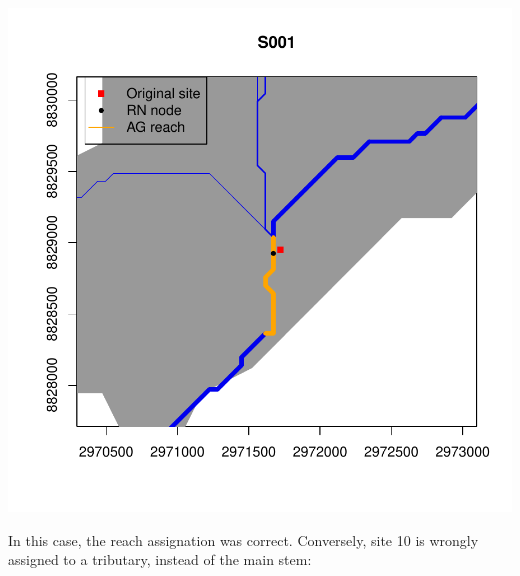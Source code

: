 \documentclass[
]{article}
\newenvironment{Shaded}{\begin{snugshade}}{\end{snugshade}}
\newcommand{\AttributeTok}[1]{\textcolor[rgb]{0.13,0.29,0.53}{#1}}
\newcommand{\DecValTok}[1]{\textcolor[rgb]{0.00,0.00,0.81}{#1}}
\newcommand{\FunctionTok}[1]{\textcolor[rgb]{0.13,0.29,0.53}{\textbf{#1}}}
\newcommand{\NormalTok}[1]{#1}
\newcommand{\SpecialCharTok}[1]{\textcolor[rgb]{0.81,0.36,0.00}{\textbf{#1}}}
\begin{document}
\includegraphics{Illustrating_eDITH_files/figure-latex/unnamed-chunk-11-1.pdf}

In this case, the reach assignation was correct. Conversely, site 10 is wrongly assigned to a tributary, instead of the main stem:

\begin{Shaded}
\end{Shaded}
\end{document}
